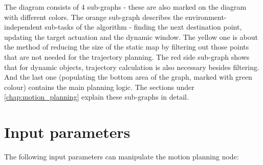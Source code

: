 The diagram consists of 4 sub-graphs - these are also marked on the diagram with different colors. The orange sub-graph describes the environment-independent sub-tasks of the algorithm - finding the next destination point, updating the target actuation and the dynamic window. The yellow one is about the method of reducing the size of the static map by filtering out those points that are not needed for the trajectory planning. The red side sub-graph shows that for dynamic objects, trajectory calculation is also necessary besides filtering. And the last one (populating the bottom area of the graph, marked with green colour) contains the main planning logic. The sections under \ref{chap:motion_planning} explain these sub-graphs in detail.

\begin{minipage}{\textwidth}
\section{Input parameters}
\label{chap:motion_planner_input_parameters}
The following input parameters can manipulate the motion planning node:


\end{minipage}
